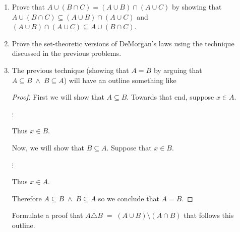 \begin{enumerate}
\wbvfill

\workbookpagebreak

\item Prove that 
$A \cup (B \cap C) = (A \cup B) \cap (A \cup C)$ by showing that 
$A \cup (B \cap C) \subseteq (A \cup B) \cap (A \cup C)$ and 
$(A \cup B) \cap (A \cup C) \subseteq A \cup (B \cap C)$.


 \wbvfill

\workbookpagebreak
 
\item Prove the set-theoretic versions of DeMorgan's laws using the technique
discussed in the previous problems.

\wbvfill

\workbookpagebreak

\item The previous technique (showing that $A=B$ by arguing that
$A \subseteq B \; \land \; B \subseteq A$) will have an outline something like

\begin{proof} 
First we will show that $A \subseteq B$.\newline
Towards that end, suppose $x \in A$.

\begin{center}
$\vdots$
\end{center}

Thus $x \in B$.

Now, we will show that $B \subseteq A$. \newline
Suppose that $x \in B$.

\begin{center}
$\vdots$
\end{center}

Thus $x \in A$.

Therefore $A \subseteq B \; \land \; B \subseteq A$ so we conclude that $A=B$.
\end{proof}

Formulate a proof that $A \triangle B \; = \; (A \cup B) \setminus (A \cap B)$ that follows this outline.

\end{enumerate}
